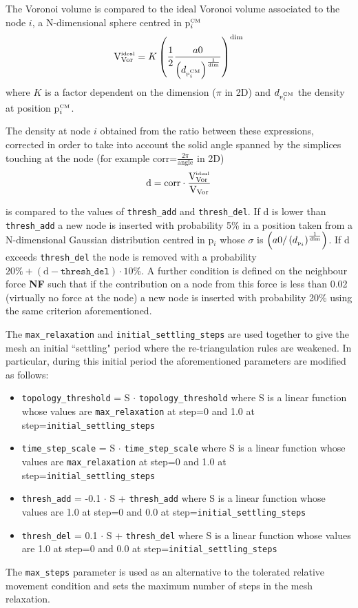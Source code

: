 \documentclass[10pt,a4paper]{book}
\newcommand{\py}[1]{\texttt{\color{blue}#1}}
\begin{document}
The Voronoi volume is compared to the ideal Voronoi volume associated
to the node $i$, a N-dimensional sphere centred in p$^{\textrm{\tiny CM}}_{\tiny i}$
  \begin{equation}
    \textrm{V}_\textrm{Vor}^{\textrm{\tiny ideal}} = K \left(\frac{1}{2}
    \frac{a0}{
      \left(d_{\textrm{\tiny p}^{\textrm{\tiny CM}}_i}\right)^{\frac{1}{\textrm{\tiny dim}}}}
    \right)^\textrm{dim} 
  \end{equation}
where $K$ is a factor dependent on the dimension ($\pi$ in 2D) and
$d_{\textrm{\tiny p}^{\textrm{\tiny CM}}_i}$ the density at position p$^{\textrm{\tiny CM}}_i$. 

The density at node $i$ obtained from the ratio between these expressions,
corrected in order to take into account the solid angle spanned by the
simplices touching at the node (for example corr=$\frac{2\pi}{\textrm{angle}}$ in 2D)
\begin{equation}
  \textrm{d} = \textrm{corr} \cdot \frac{\textrm{V}_\textrm{Vor}^{\textrm{\tiny
        ideal}}}{\textrm{V}_\textrm{Vor}} 
  \nonumber 
\end{equation}

is compared to the values of \texttt{thresh\_add} and
\texttt{thresh\_del}. If d is lower than \texttt{thresh\_add} a new
node is inserted with probability 5\% in a position taken from a
N-dimensional Gaussian distribution centred in p$_i$ whose $\sigma$ is $\left(a0/
      \left(d_{\textrm{\tiny p}_i}\right)^{\frac{1}{\textrm{\tiny
            dim}}}\right)$.   If d  exceeds \texttt{thresh\_del}
    the node is removed with a probability $20\% +
    \left(\textrm{d}-\texttt{thresh\_del}\right)\cdot 10$\%. 
A further condition is defined on the neighbour force \textbf{NF} such
that if the contribution on a node from this force is less than 0.02
(virtually no force at the node) a new node is inserted with
probability 20\% using the same criterion aforementioned.


The \py{max\_relaxation} and \py{initial\_settling\_steps} are used
together to give the mesh an initial ``settling" period where the
re-triangulation rules are weakened. In particular, during this initial  
period the aforementioned parameters are modified as follows:
\begin{itemize} 
\item \texttt{topology\_threshold}  = S $\cdot$
  \texttt{topology\_threshold} where S is a linear function
  whose values are  \texttt{max\_relaxation} at step=0 and 1.0 at
  step=\texttt{initial\_settling\_steps}  
\item \texttt{time\_step\_scale} = S $\cdot$
  \texttt{time\_step\_scale} 
  where S is a linear function 
  whose values are \texttt{max\_relaxation} at step=0 and 1.0 at
  step=\texttt{initial\_settling\_steps}  
\item \texttt{thresh\_add} = -0.1 $\cdot$ S + \texttt{thresh\_add} 
 where S is a linear function
  whose values are 1.0 at step=0 and 0.0 at step=\texttt{initial\_settling\_steps} 
\item \texttt{thresh\_del} =  0.1 $\cdot$ S + \texttt{thresh\_del}
  where S is a linear function
  whose values are 1.0 at step=0 and 0.0 at step=\texttt{initial\_settling\_steps} 
\end{itemize} 

The \py{max\_steps} parameter is used as an alternative to the tolerated
relative movement condition and sets the maximum number of steps in
the mesh relaxation.  
\end{document}

